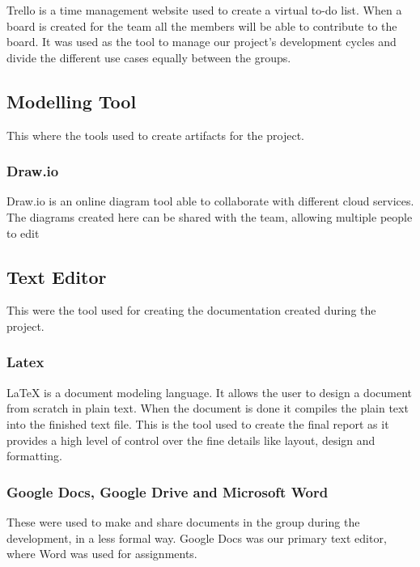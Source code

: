 Trello is a time management website used to create a virtual to-do list. When
 a board is created for the team all the members will be able to contribute to
  the board. It was used as the tool to manage our project’s development cycles
   and divide the different use cases equally between the groups.

\subsection{Modelling Tool}

This where the tools used to create artifacts for the project.

\subsubsection{Draw.io}

Draw.io is an online diagram tool able to collaborate with different cloud
 services. The diagrams created here can be shared with the team, allowing
  multiple people to edit

\subsection{Text Editor}

This were the tool used for creating the documentation created during
 the project.

\subsubsection{Latex}

 LaTeX is a document modeling language. It allows the user to design
  a document from scratch in plain text. When the document is done it compiles
   the plain text into the finished text file. This is the tool used to create
    the final report as it provides a high level of control over the fine
     details like layout, design and formatting.

\subsubsection{Google Docs, Google Drive and Microsoft Word}

These were used to make and share documents in the group during the
 development, in a less formal way. Google Docs was our primary text
  editor, where Word was used for assignments.
